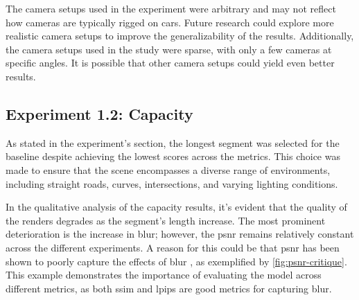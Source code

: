The camera setups used in the experiment were arbitrary and may not reflect how cameras are typically rigged on cars. Future research could explore more realistic camera setups to improve the generalizability of the results. Additionally, the camera setups used in the study were sparse, with only a few cameras at specific angles. It is possible that other camera setups could yield even better results.


\begin{comment}
- The position of the camera was arbitrary. Could've done more research into how cameras on cars usually are rigged.
- The camera setups are very sparse, a lot of different possibilities.

Results:
- Relatively little difference in the quantitative results.
- Why did the -10 and 10 yaw yield the best SSIM and LPIPS?
- The evaluation images are a subset of the training images. Because the -10 and 10 have a lot of overlap, they have a lot of common training data which will allow the model to learn the scene which it is evaluated on, in turn yielding high scores on the chosen metrics.


This overlap allows the model to train and learn the scene which it is evaluated on, because the evaluation set is a subset of the training images, more than the other setups, and it'll naturally score high on the respective images.

the model to train on the partial scene with two times the amount of data, and since the evaluation set is a subset of the training images, it'll naturally score high on the respective images.

\end{comment}










\subsection{Experiment 1.2: Capacity} 
As stated in the experiment's section, the longest segment was selected for the baseline despite achieving the lowest scores across the metrics. This choice was made to ensure that the scene encompasses a diverse range of environments, including straight roads, curves, intersections, and varying lighting conditions.

In the qualitative analysis of the capacity results, it's evident that the quality of the renders degrades as the segment's length increase. The most prominent deterioration is the increase in blur; however, the \acrshort{psnr} remains relatively constant across the different experiments. A reason for this could be that \acrshort{psnr} has been shown to poorly capture the effects of blur \cite{videoprocessingai}, as exemplified by \autoref{fig:psnr-critique}. This example demonstrates the importance of evaluating the model across different metrics, as both \acrshort{ssim} and \acrshort{lpips} are good metrics for capturing blur.

